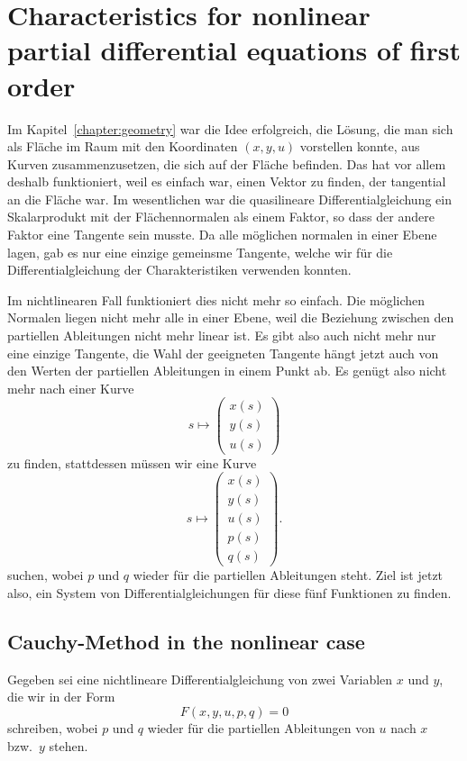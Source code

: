 %
%
%
\section{Characteristics for nonlinear partial differential equations of first order}
Im Kapitel~\ref{chapter:geometry} war die Idee erfolgreich, die Lösung,
die man sich als Fläche im Raum mit den Koordinaten $(x,y,u)$
vorstellen konnte, aus Kurven zusammenzusetzen, die sich auf der
Fläche befinden. Das hat vor allem deshalb funktioniert, weil es
einfach war, einen Vektor zu finden, der tangential an die Fläche
war. Im wesentlichen war die quasilineare Differentialgleichung ein
Skalarprodukt mit der Flächennormalen als einem Faktor, so dass
der andere Faktor eine Tangente sein musste. Da alle möglichen
normalen in einer Ebene lagen, gab es nur eine einzige gemeinsme
Tangente, welche wir für die Differentialgleichung der
Charakteristiken verwenden konnten.

Im nichtlinearen Fall funktioniert dies nicht mehr so einfach.
Die möglichen Normalen liegen nicht mehr alle in einer Ebene,
weil die Beziehung zwischen den partiellen Ableitungen nicht
mehr linear ist. Es gibt also auch nicht mehr nur eine einzige
Tangente, die Wahl der geeigneten Tangente hängt jetzt auch
von den Werten der partiellen Ableitungen in einem Punkt ab.
Es genügt also nicht mehr nach einer Kurve
\[
s\mapsto
\begin{pmatrix}
x(s)\\
y(s)\\
u(s)
\end{pmatrix}
\]
zu finden, stattdessen müssen wir eine Kurve 
\[
s\mapsto
\begin{pmatrix}
x(s)\\
y(s)\\
u(s)\\
p(s)\\
q(s)
\end{pmatrix}.
\]
suchen, wobei $p$ und $q$ wieder für die partiellen Ableitungen
steht. Ziel ist jetzt also, ein System von Differentialgleichungen
für diese fünf Funktionen zu finden.

\subsection{Cauchy-Method in the nonlinear case}
Gegeben sei eine nichtlineare Differentialgleichung von zwei
Variablen $x$ und $y$, die wir in der Form
\[
F(x,y,u,p,q)=0
\]
schreiben, wobei $p$ und $q$ wieder für die partiellen Ableitungen
von $u$ nach $x$ bzw.~$y$ stehen.

